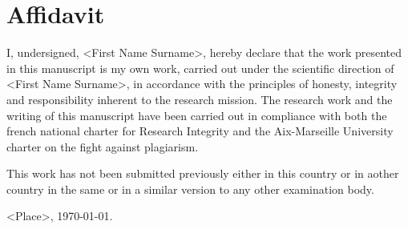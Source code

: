 	\chapter*{Affidavit}
	
	I, undersigned,
	<First Name Surname>,
	hereby declare that the work presented in this manuscript is my own work, 
	carried out under the scientific direction of
	<First Name Surname>,
	in accordance with the principles of honesty, integrity and responsibility 
	inherent to the research mission. The research work and the writing of this 
	manuscript have been carried out in compliance with both the french 
	national charter for Research Integrity and the Aix-Marseille University 
	charter on the fight against plagiarism.
	
	This work has not been submitted previously either in this country or in 
	aother country in the same or in a similar version to any other examination 
	body.
	
	<Place>, \today.
	
	\begin{flushright}
	\end{flushright}
\fi

%
